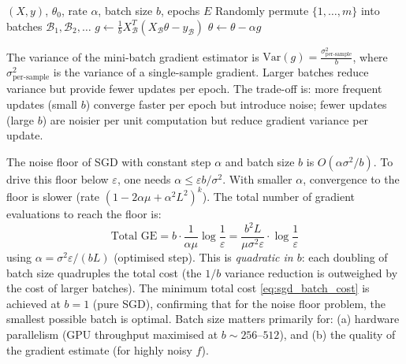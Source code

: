 \documentclass[11pt,a4paper]{article}
\theoremstyle{definition}
\begin{document}
\begin{algorithm}[H]
\caption{Mini-Batch SGD}
\label{alg:sgd}
\begin{algorithmic}[1]
\Require $(X, y)$, $\theta_0$, rate $\alpha$, batch size $b$, epochs $E$
    \State Randomly permute $\{1, \ldots, m\}$ into batches $\mathcal{B}_1, \mathcal{B}_2, \ldots$
        \State $g \gets \frac{1}{b} X_{\mathcal{B}}^T(X_{\mathcal{B}}\theta - y_{\mathcal{B}})$ 
        \State $\theta \gets \theta - \alpha g$
    \EndFor
\EndFor
\end{algorithmic}
\end{algorithm}

The variance of the mini-batch gradient estimator is $\text{Var}(g) = \frac{\sigma^2_{\text{per-sample}}}{b}$, where $\sigma^2_{\text{per-sample}}$ is the variance of a single-sample gradient. Larger batches reduce variance but provide fewer updates per epoch. The trade-off is: more frequent updates (small $b$) converge faster per epoch but introduce noise; fewer updates (large $b$) are noisier per unit computation but reduce gradient variance per update.

The noise floor of SGD with constant step $\alpha$ and batch size $b$ is $O(\alpha \sigma^2 / b)$. To drive this floor below $\varepsilon$, one needs $\alpha \leq \varepsilon b / \sigma^2$. With smaller $\alpha$, convergence to the floor is slower (rate $(1 - 2\alpha\mu + \alpha^2 L^2)^k$). The total number of gradient evaluations to reach the floor is:
\begin{equation}
\text{Total GE} = b \cdot \frac{1}{\alpha \mu} \log\frac{1}{\varepsilon} = \frac{b^2 L}{\mu \sigma^2 \varepsilon} \cdot \log\frac{1}{\varepsilon}
\label{eq:sgd_batch_cost}
\end{equation}
using $\alpha = \sigma^2 \varepsilon / (bL)$ (optimised step). This is \emph{quadratic in $b$}: each doubling of batch size quadruples the total cost (the $1/b$ variance reduction is outweighed by the cost of larger batches). The minimum total cost \eqref{eq:sgd_batch_cost} is achieved at $b = 1$ (pure SGD), confirming that for the noise floor problem, the smallest possible batch is optimal. Batch size matters primarily for: (a) hardware parallelism (GPU throughput maximised at $b \sim 256$--$512$), and (b) the quality of the gradient estimate (for highly noisy $f$).
\end{document}
